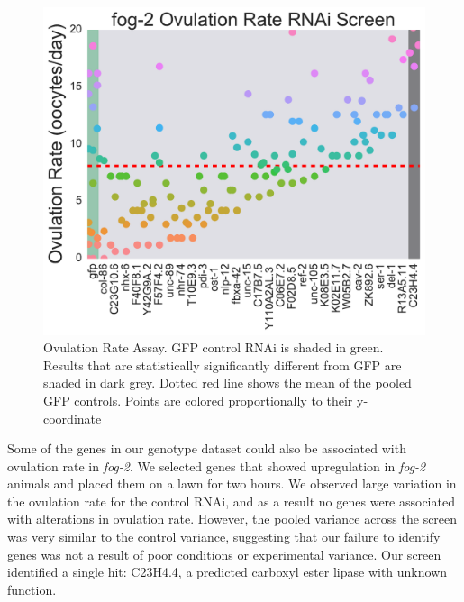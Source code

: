 \documentclass[9pt,twocolumn,twoside]{gsag3jnl}
\newcommand{\fog}{\emph{fog-2}}
\begin{document}
\begin{figure}
\renewcommand{\familydefault}{\sfdefault}\normalfont{}
\centering
\includegraphics[width=\linewidth]{../output/figs/final_figs/oocyte_rate_assay.pdf}
\caption{Ovulation Rate Assay. GFP control RNAi is shaded in green. Results that are statistically significantly different from GFP are shaded in dark grey. Dotted red line shows the mean of the pooled GFP controls. Points are colored proportionally to their y-coordinate
}%
\label{fig:oocytedropping}
\end{figure}

Some of the genes in our genotype dataset could also be associated with ovulation rate in \fog{}. We selected genes that showed upregulation in \fog{} animals and placed them on a lawn for two hours. We observed large variation in the ovulation rate for the control RNAi, and as a result no genes were associated with alterations in ovulation rate. However, the pooled variance across the screen was very similar to the control variance, suggesting that our failure to identify genes was not a result of poor conditions or experimental variance. Our screen identified a single hit: C23H4.4, a predicted carboxyl ester lipase with unknown function.
\end{document}
